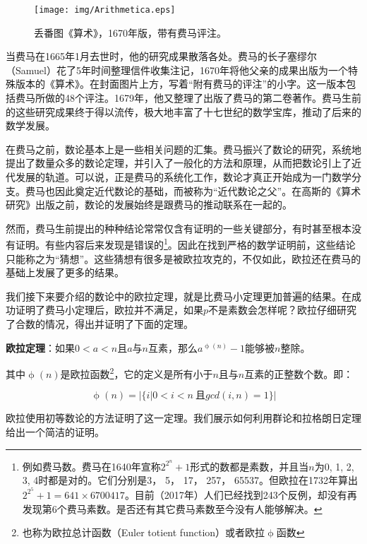 \documentclass{article}
\begin{document}
\begin{figure}
 \centering
 \texttt{[image: img/Arithmetica.eps]}
 \captionsetup{labelformat=empty}
 \caption{丢番图《算术》，1670年版，带有费马评注。}
 \label{fig:Arithmetica}
\end{figure}

当费马在1665年1月去世时，他的研究成果散落各处。费马的长子塞缪尔（Samuel）花了5年时间整理信件收集注记，1670年将他父亲的成果出版为一个特殊版本的《算术》。在封面图片上方，写着“附有费马的评注”的小字。这一版本包括费马所做的48个评注。1679年，他又整理了出版了费马的第二卷著作。费马生前的这些研究成果终于得以流传，极大地丰富了十七世纪的数学宝库，推动了后来的数学发展。

在费马之前，数论基本上是一些相关问题的汇集。费马振兴了数论的研究，系统地提出了数量众多的数论定理，并引入了一般化的方法和原理，从而把数论引上了近代发展的轨道。可以说，正是费马的系统化工作，数论才真正开始成为一门数学分支。费马也因此奠定近代数论的基础，而被称为“近代数论之父”。在高斯的《算术研究》出版之前，数论的发展始终是跟费马的推动联系在一起的。

然而，费马生前提出的种种结论常常仅含有证明的一些关键部分，有时甚至根本没有证明。有些内容后来发现是错误的\footnote{例如费马数。费马在1640年宣称$2^{2^n}+1$形式的数都是素数，并且当$n$为0, 1, 2, 3, 4时都是对的。它们分别是3， 5， 17， 257， 65537。但欧拉在1732年算出$2^{2^5} + 1 = 641 \times 6700417$。目前（2017年）人们已经找到243个反例，却没有再发现第6个费马素数。是否还有其它费马素数至今没有人能够解决。}。因此在找到严格的数学证明前，这些结论只能称之为“猜想”。这些猜想有很多是被欧拉攻克的，不仅如此，欧拉还在费马的基础上发展了更多的结果。

我们接下来要介绍的数论中的欧拉定理，就是比费马小定理更加普遍的结果。在成功证明了费马小定理后，欧拉并不满足，如果$p$不是素数会怎样呢？欧拉仔细研究了合数的情况，得出并证明了下面的定理。

\begin{theorem}
\textbf{欧拉定理}：如果$0 < a < n$且$a$与$n$互素，那么$a^{\upphi(n)} - 1$能够被$n$整除。
\end{theorem}

其中$\upphi(n)$是欧拉函数\footnote{也称为欧拉总计函数（Euler totient function）或者欧拉$\upphi$函数}，它的定义是所有小于$n$且与$n$互素的正整数个数。即：

\[
\upphi(n) = |\{i | 0 < i < n\ \text{且} gcd(i, n) = 1 \}|
\]

欧拉使用初等数论的方法证明了这一定理。我们展示如何利用群论和拉格朗日定理给出一个简洁的证明。
\end{document}
